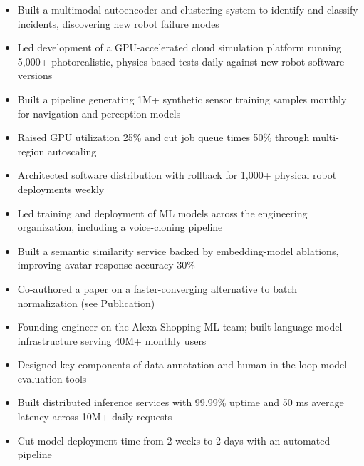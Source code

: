 \documentclass{my_cv}
\begin{document}

\begin{itemize}
\item Built a multimodal autoencoder and clustering system to identify and classify incidents, discovering new robot failure modes
\item Led development of a GPU-accelerated cloud simulation platform running 5,000+ photorealistic, physics-based tests daily against new robot software versions
\item Built a pipeline generating 1M+ synthetic sensor training samples monthly for navigation and perception models
\item Raised GPU utilization 25\% and cut job queue times 50\% through multi-region autoscaling
\item Architected software distribution with rollback for 1,000+ physical robot deployments weekly
\end{itemize}


\begin{itemize}
\item Led training and deployment of ML models across the engineering organization, including a voice-cloning pipeline
\item Built a semantic similarity service backed by embedding-model ablations, improving avatar response accuracy 30\%
\item Co-authored a paper on a faster-converging alternative to batch normalization (see Publication)
\end{itemize}


\begin{itemize}
\item Founding engineer on the Alexa Shopping ML team; built language model infrastructure serving 40M+ monthly users
\item Designed key components of data annotation and human-in-the-loop model evaluation tools
\item Built distributed inference services with 99.99\% uptime and 50 ms average latency across 10M+ daily requests
\item Cut model deployment time from 2 weeks to 2 days with an automated pipeline
\end{itemize}
\end{document}
